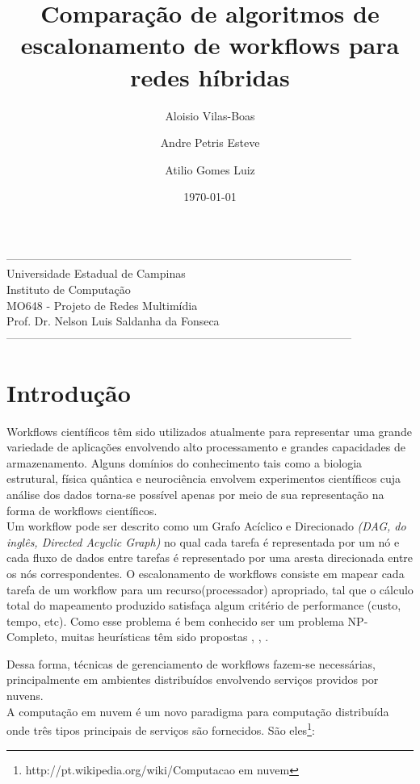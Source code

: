 \documentclass[a4paper,10pt]{article}
\title{Comparação de algoritmos de escalonamento de workflows para redes híbridas}
\author{Aloisio Vilas-Boas\and Andre Petris Esteve\and Atilio Gomes Luiz}
\date{\today}
\begin{document}
\maketitle

\begin{center}
--------------------------------------------------------------------------------------------\\
Universidade Estadual de Campinas\\
Instituto de Computação\\
MO648 - Projeto de Redes Multimídia\\
Prof. Dr. Nelson Luis Saldanha da Fonseca\\
--------------------------------------------------------------------------------------------\\
\end{center}

\section{Introdução}

Workflows científicos têm sido utilizados atualmente para representar uma grande variedade de aplicações envolvendo
alto processamento e grandes capacidades de armazenamento. Alguns domínios do conhecimento tais como a biologia estrutural,
física quântica e neurociência envolvem experimentos científicos cuja análise dos dados torna-se possível apenas por meio de sua representação
na forma de workflows científicos\cite{pso_a}.\\

Um workflow pode ser descrito como um Grafo Acíclico e Direcionado \emph{(DAG, do inglês, Directed Acyclic Graph)} no qual cada tarefa 
é representada por um nó e cada fluxo de dados entre tarefas é representado por uma aresta direcionada entre os nós correspondentes. O escalonamento 
de workflows consiste em mapear cada tarefa de um workflow para um recurso(processador) apropriado, tal que o cálculo total do mapeamento produzido 
satisfaça algum critério de performance (custo, tempo, etc). Como esse problema é bem conhecido ser um problema NP-Completo, muitas heurísticas têm 
sido propostas \cite{bit}, \cite{pso_a}, \cite{pcp}.

Dessa forma, técnicas de gerenciamento de workflows fazem-se necessárias, principalmente em ambientes distribuídos 
envolvendo serviços providos por nuvens.\\

A computação em nuvem é um novo paradigma para computação distribuída onde três tipos principais de serviços são fornecidos. São eles\footnote{http://pt.wikipedia.org/wiki/Computacao em nuvem}:
\end{document}
